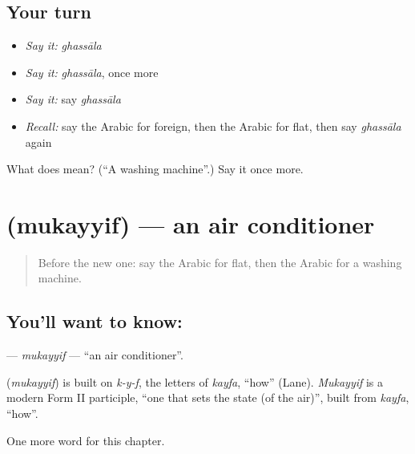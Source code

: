 \subsection*{Your turn}
\begin{itemize}
\raggedright
  \item \emph{Say it:} \emph{ghassāla}
  \item \emph{Say it:} \emph{ghassāla}, once more
  \item \emph{Say it:} say \emph{ghassāla}
  \item \emph{Recall:} say the Arabic for foreign, then the Arabic for flat, then say \emph{ghassāla} again
\end{itemize}

\begin{tcolorbox}[breakable,colback=teal!4,colframe=teal!35!black,title={Before you move on}]
What does  mean? (\textquotedblleft{}A washing machine\textquotedblright{}.) Say it once more.
\end{tcolorbox}
\section[\texorpdfstring{\ar{مكيف} (mukayyif)}{مكيف (mukayyif)}]{ (mukayyif) — an air conditioner}

\label{lesson:AR-C181-mukayyif}



\begin{quote}
Before the new one: say the Arabic for flat, then the Arabic for a washing machine.
\end{quote}

\subsection*{You'll want to know: }
\textbf{} — \emph{mukayyif} — \textquotedblleft{}an air conditioner\textquotedblright{}.

\begin{cousinweb}
\textbf{} (\emph{mukayyif}) is built on \emph{k-y-f}, the letters of \emph{kayfa}, \textquotedblleft{}how\textquotedblright{} (Lane). \emph{Mukayyif} is a modern Form II participle, \textquotedblleft{}one that sets the state (of the air)\textquotedblright{}, built from \emph{kayfa}, \textquotedblleft{}how\textquotedblright{}.
\end{cousinweb}

\begin{grammarlens}[title={What you've built}]
One more word for this chapter.
\end{grammarlens}

